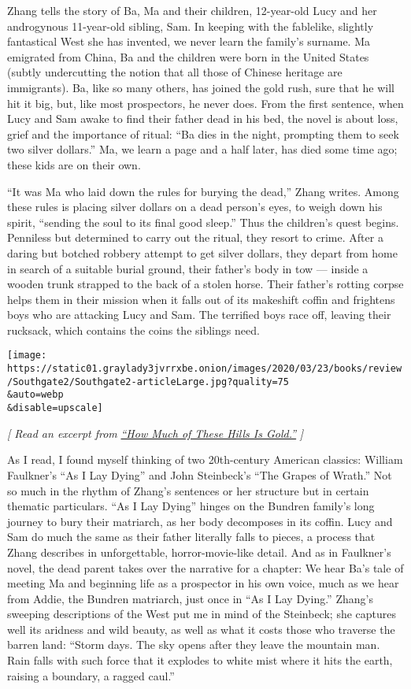 Zhang tells the story of Ba, Ma and their children, 12-year-old Lucy and
her androgynous 11-year-old sibling, Sam. In keeping with the fablelike,
slightly fantastical West she has invented, we never learn the family's
surname. Ma emigrated from China, Ba and the children were born in the
United States (subtly undercutting the notion that all those of Chinese
heritage are immigrants). Ba, like so many others, has joined the gold
rush, sure that he will hit it big, but, like most prospectors, he never
does. From the first sentence, when Lucy and Sam awake to find their
father dead in his bed, the novel is about loss, grief and the
importance of ritual: ``Ba dies in the night, prompting them to seek two
silver dollars.'' Ma, we learn a page and a half later, has died some
time ago; these kids are on their own.

``It was Ma who laid down the rules for burying the dead,'' Zhang
writes. Among these rules is placing silver dollars on a dead person's
eyes, to weigh down his spirit, ``sending the soul to its final good
sleep.'' Thus the children's quest begins. Penniless but determined to
carry out the ritual, they resort to crime. After a daring but botched
robbery attempt to get silver dollars, they depart from home in search
of a suitable burial ground, their father's body in tow --- inside a
wooden trunk strapped to the back of a stolen horse. Their father's
rotting corpse helps them in their mission when it falls out of its
makeshift coffin and frightens boys who are attacking Lucy and Sam. The
terrified boys race off, leaving their rucksack, which contains the
coins the siblings need.

\texttt{[image: https://static01.graylady3jvrrxbe.onion/images/2020/03/23/books/review/Southgate2/Southgate2-articleLarge.jpg?quality=75\\\&auto=webp\\\&disable=upscale]}

\emph{{[} Read an excerpt from}
\href{https://www.nytimes3xbfgragh.onion/2020/04/07/books/review/how-much-of-these-hills-is-gold-by-c-pam-zhang-an-excerpt.html}{\emph{``How
Much of These Hills Is Gold.''}} \emph{{]}}

As I read, I found myself thinking of two 20th-century American
classics: William Faulkner's ``As I Lay Dying'' and John Steinbeck's
``The Grapes of Wrath.'' Not so much in the rhythm of Zhang's sentences
or her structure but in certain thematic particulars. ``As I Lay Dying''
hinges on the Bundren family's long journey to bury their matriarch, as
her body decomposes in its coffin. Lucy and Sam do much the same as
their father literally falls to pieces, a process that Zhang describes
in unforgettable, horror-movie-like detail. And as in Faulkner's novel,
the dead parent takes over the narrative for a chapter: We hear Ba's
tale of meeting Ma and beginning life as a prospector in his own voice,
much as we hear from Addie, the Bundren matriarch, just once in ``As I
Lay Dying.'' Zhang's sweeping descriptions of the West put me in mind of
the Steinbeck; she captures well its aridness and wild beauty, as well
as what it costs those who traverse the barren land: ``Storm days. The
sky opens after they leave the mountain man. Rain falls with such force
that it explodes to white mist where it hits the earth, raising a
boundary, a ragged caul.''

